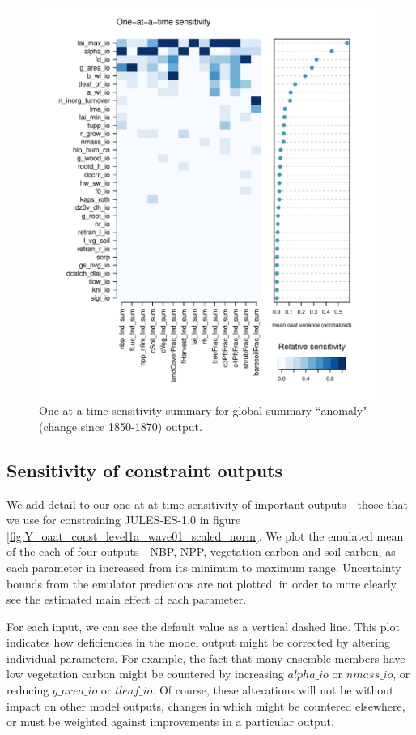 \documentclass[gmd, manuscript]{copernicus}
\begin{document}
\begin{figure}[t]
\includegraphics[width=12cm]{./figs/fig08.pdf}
\caption{One-at-a-time sensitivity summary for global summary ``anomaly" (change since 1850-1870) output.}
\label{fig:oat_var_sensmat_level1a_wave01_Anom}
\end{figure}

\subsection{Sensitivity of constraint outputs}\label{ssec:sa_constraint_outputs}

We add detail to our one-at-at-time sensitivity of important outputs - those that we use for constraining JULES-ES-1.0 in figure \ref{fig:Y_oaat_const_level1a_wave01_scaled_norm}. We plot the emulated mean of the each of four outputs - NBP, NPP, vegetation carbon and soil carbon, as each parameter in increased from its minimum to maximum range. Uncertainty bounds from the emulator predictions are not plotted, in order to more clearly see the estimated main effect of each parameter.

For each input, we can see the default value as a vertical dashed line. This plot indicates how deficiencies in the model output might be corrected by altering individual parameters. For example, the fact that many ensemble members have low vegetation carbon might be countered by increasing $alpha\_io$ or $nmass\_io$, or reducing $g\_area\_io$ or $tleaf\_io$. Of course, these alterations will not be without impact on other model outputs, changes in which might be countered elsewhere, or must be weighted against improvements in a particular output.
\end{document}

